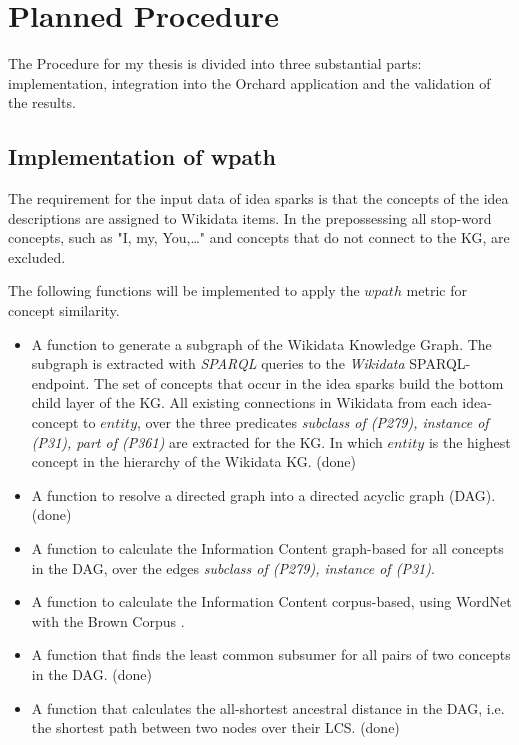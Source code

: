 \documentclass[pdftex,a4paper,12pt]{scrartcl}
\theoremstyle{definition}
\begin{document}

\section{Planned Procedure}
    The Procedure for my thesis is divided into three substantial parts: implementation, integration into the Orchard application and the validation of the results. 
    \subsection{Implementation of wpath}
    
    The requirement for the input data of idea sparks is that the concepts of the idea descriptions are assigned to Wikidata items. In the prepossessing all stop-word concepts, such as "I, my, You,\dots" and concepts that do not connect to the KG, are excluded.
    
    The following functions will be implemented to apply the $wpath$ metric for concept similarity.
    \begin{itemize}
        \item A function to generate a subgraph of the Wikidata Knowledge Graph.
        The subgraph is extracted with \textit{SPARQL} queries to the \textit{Wikidata} SPARQL-endpoint. The set of concepts that occur in the idea sparks build the bottom child layer of the KG. All existing connections in Wikidata from each idea-concept to $entity$, over the three predicates \textit{subclass of (P279), instance of (P31), part of (P361)} are extracted for the KG. In which $entity$ is the highest concept in the hierarchy of the Wikidata KG. (done)
        \item A function to resolve a directed graph into a directed acyclic graph (DAG). (done)
        \item A function to calculate the Information Content graph-based for all concepts in the DAG, over the edges \textit{subclass of (P279), instance of (P31)}. 
        \item A function to calculate the Information Content corpus-based, using WordNet with the Brown Corpus \citep{francis_standard_1964}. 
        \item A function that finds the least common subsumer for all pairs of two concepts in the DAG. (done)
        \item A function that calculates the all-shortest ancestral distance in the DAG, i.e. the shortest path between two nodes over their LCS. (done)
    \end{itemize}
    
\end{document}
